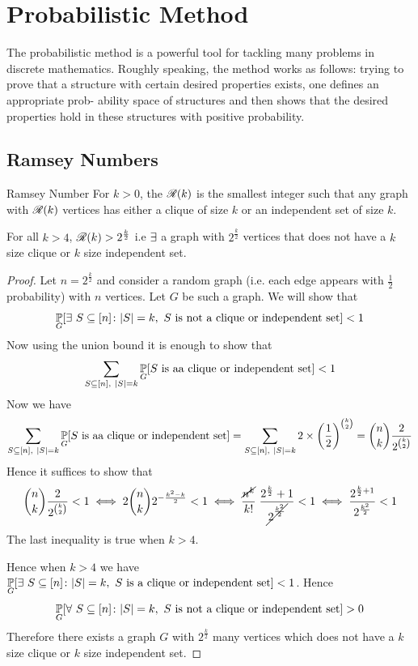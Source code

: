 \section{Probabilistic Method}
The probabilistic method is a powerful tool for tackling many problems in discrete
mathematics. Roughly speaking, the method works as follows: trying to prove that
a structure with certain desired properties exists, one defines an appropriate prob-
ability space of structures and then shows that the desired properties hold in these
structures with positive probability.
\subsection{Ramsey Numbers}
\begin{Definition}{Ramsey Number}{}
	For $k>0$, the ${\mathscr{R}}(k)$ is the smallest integer such that any graph with ${\mathscr{R}}(k)$ vertices  has either a clique of size $k$ or an independent set of size $k$.
\end{Definition}
\begin{lemma}{}{}
	For all $k>4$, ${\mathscr{R}}(k)>2^{\frac{k}2}$ i.e  $\exists$ a graph with $2^{\frac{k}2}$ vertices that does not have a $k$ size clique or $k$ size independent set.
\end{lemma}
\begin{proof}
	Let $n=2^{\frac{k}2}$ and consider a random graph (i.e. each edge appears with $\frac12$ probability) with $n$ vertices. Let $G$ be such a graph. We will show that $$\underset{G}{\mathbb{P}}[\exists\ S\subseteq [n]\colon |S|=k, \ S\text{ is not a clique or independent set}]<1$$Now using the union bound it is enough to show that $$\sum_{S\subseteq[n],\ |S|=k}\underset{G}{\bbP}[S\text{ is aa clique or independent set}]<1$$Now we have $$\sum_{S\subseteq[n],\ |S|=k}\underset{G}{\bbP}[S\text{ is aa clique or independent set}]=\sum_{S\subseteq[n],\ |S|=k}2\times \lt(\frac12\rt)^{\binom{k}2}=\binom{n}{k}\frac{2}{2^{\binom{k}2}}$$Hence it suffices to show that $$\binom{n}{k}\frac{2}{2^{\binom{k}2}}<1\iff 2\binom{n}k2^{-\frac{k^2-k}2}<1\iff \frac{\cancel{n^k}}{k!}\;\frac{2^\frac{k}2+1}{\cancel{2\strut^{\frac{k^2}2}}}<1\iff\frac{2^{\frac{k}2+1}}{2^{\frac{k^2}2}}<1$$The last inequality is  true when $k> 4$.
	
	Hence when $k>4$ we have $\underset{G}{\mathbb{P}}[\exists\ S\subseteq [n]\colon |S|=k, \ S\text{ is a clique or independent set}]<1$. Hence $$\underset{G}{\mathbb{P}}[\forall\ S\subseteq [n]\colon |S|=k, \ S\text{ is not a clique or independent set}]>0$$Therefore there exists a graph $G$ with $2^{\frac{k}2}$ many vertices which does not have a $k$ size clique or $k$ size independent set. 
\end{proof}
